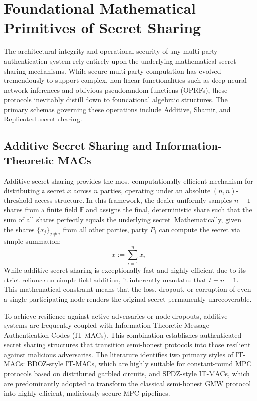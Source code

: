 \documentclass[11pt, a4paper]{article}
\begin{document}
\section*{Foundational Mathematical Primitives of Secret Sharing}
The architectural integrity and operational security of any multi-party authentication system rely entirely upon the underlying mathematical secret sharing mechanisms. While secure multi-party computation has evolved tremendously to support complex, non-linear functionalities such as deep neural network inferences and oblivious pseudorandom functions (OPRFs), these protocols inevitably distill down to foundational algebraic structures. The primary schemas governing these operations include Additive, Shamir, and Replicated secret sharing.

\subsection*{Additive Secret Sharing and Information-Theoretic MACs}
Additive secret sharing provides the most computationally efficient mechanism for distributing a secret $x$ across $n$ parties, operating under an absolute $(n, n)$-threshold access structure. In this framework, the dealer uniformly samples $n-1$ shares from a finite field $\mathbb{F}$ and assigns the final, deterministic share such that the sum of all shares perfectly equals the underlying secret. Mathematically, given the shares $\{x_j\}_{j \neq i}$ from all other parties, party $P_i$ can compute the secret via simple summation:
\[ x := \sum_{i=1}^n x_i \]
While additive secret sharing is exceptionally fast and highly efficient due to its strict reliance on simple field addition, it inherently mandates that $t=n-1$. This mathematical constraint means that the loss, dropout, or corruption of even a single participating node renders the original secret permanently unrecoverable.

To achieve resilience against active adversaries or node dropouts, additive systems are frequently coupled with Information-Theoretic Message Authentication Codes (IT-MACs). This combination establishes authenticated secret sharing structures that transition semi-honest protocols into those resilient against malicious adversaries. The literature identifies two primary styles of IT-MACs: BDOZ-style IT-MACs, which are highly suitable for constant-round MPC protocols based on distributed garbled circuits, and SPDZ-style IT-MACs, which are predominantly adopted to transform the classical semi-honest GMW protocol into highly efficient, maliciously secure MPC pipelines.
\end{document}
